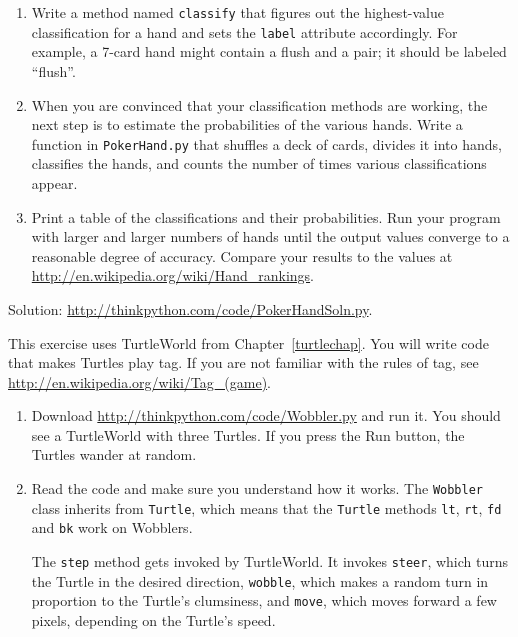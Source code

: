 \documentclass[10pt]{book}
\begin{document}
\begin{CJK}{UTF8}{gbsn}
\begin{exercise}
\begin{enumerate}
\item Write a method named {\tt classify} that figures out
the highest-value classification for a hand and sets the
{\tt label} attribute accordingly.  For example, a 7-card hand
might contain a flush and a pair; it should be labeled ``flush''.

\item When you are convinced that your classification methods are
working, the next step is to estimate the probabilities of the various
hands.  Write a function in {\tt PokerHand.py} that shuffles a deck of
cards, divides it into hands, classifies the hands, and counts the
number of times various classifications appear.

\item Print a table of the classifications and their probabilities.
Run your program with larger and larger numbers of hands until the
output values converge to a reasonable degree of accuracy.  Compare
your results to the values at \url{http://en.wikipedia.org/wiki/Hand_rankings}.

\end{enumerate}

Solution: \url{http://thinkpython.com/code/PokerHandSoln.py}.
\end{exercise}


\begin{exercise}

This exercise uses TurtleWorld from Chapter~\ref{turtlechap}.
You will write code that makes Turtles play tag.  If you
are not familiar with the rules of tag, see
\url{http://en.wikipedia.org/wiki/Tag_(game)}.

\begin{enumerate}

\item Download \url{http://thinkpython.com/code/Wobbler.py} and run it.  You
should see a TurtleWorld with three Turtles.  If you press the
{\sf Run} button, the Turtles wander at random.

\item Read the code and make sure you understand how it works.
The {\tt Wobbler} class inherits from {\tt Turtle}, which means
that the {\tt Turtle} methods {\tt lt}, {\tt rt}, {\tt fd}
and {\tt bk} work on Wobblers.

The {\tt step} method gets invoked by TurtleWorld.  It invokes 
{\tt steer}, which turns the Turtle in the desired direction,
{\tt wobble}, which makes a random turn in proportion to the Turtle's
clumsiness, and {\tt move}, which moves forward a few pixels,
depending on the Turtle's speed.


\end{enumerate}
\end{exercise}
\end{CJK}
\end{document}
